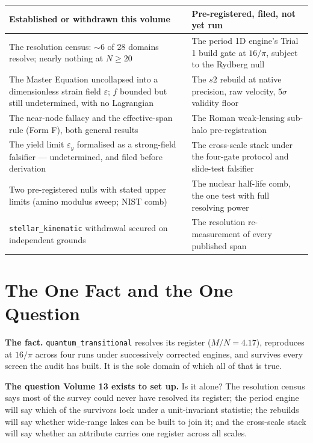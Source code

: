 \documentclass[11pt, letterpaper, openany]{book}
\newcommand{\MN}{M/N}
\begin{document}
\begin{table}[H]
\centering
\small
\begin{tabular}{@{}p{}p{}@{}}
\toprule
\textbf{Established or withdrawn this volume} & \textbf{Pre-registered, filed, not yet run} \\
\midrule
The resolution census: $\sim$6 of 28 domains resolve; nearly nothing at $N \geq 20$ & The period
1D engine's Trial 1 build gate at $16/\pi$, subject to the Rydberg null \\
\addlinespace
The Master Equation uncollapsed into a dimensionless strain field $\varepsilon$; $f$ bounded but
still undetermined, with no Lagrangian & The $s2$ rebuild
at native precision, raw velocity, $5\sigma$ validity floor \\
\addlinespace
The near-node fallacy and the effective-span rule (Form F), both general results & The Roman weak-lensing sub-halo pre-registration \\
\addlinespace
The yield limit $\varepsilon_y$ formalised as a strong-field falsifier --- undetermined, and filed
before derivation & The cross-scale stack under the four-gate protocol and slide-test falsifier \\
\addlinespace
Two pre-registered nulls with stated upper limits (amino modulus sweep; NIST comb) & The nuclear
half-life comb, the one test with full resolving power \\
\addlinespace
\texttt{stellar\_kinematic} withdrawal secured on independent grounds & The resolution
re-measurement of every published span \\
\bottomrule
\end{tabular}
\end{table}

\section{The One Fact and the One Question}

\begin{signalbox}
\textbf{The fact.} \texttt{quantum\_transitional} resolves its register ($\MN = 4.17$), reproduces
at $16/\pi$ across four runs under successively corrected engines, and survives every screen the
audit has built. It is the sole domain of which all of that is true.

\medskip
\textbf{The question Volume 13 exists to set up.} Is it alone? The resolution census says most of
the survey could never have resolved its register; the period engine will say which of the survivors
lock under a unit-invariant statistic; the rebuilds will say whether wide-range lakes can be built to
join it; and the cross-scale stack will say whether an attribute carries one register across all scales.
\end{signalbox}
\end{document}

